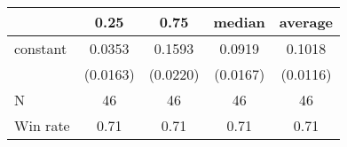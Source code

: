 \begin{tabular}{lcccc}
\hline
         &   0.25   &   0.75   &  median  & average   \\
\midrule
\midrule
constant & 0.0353   & 0.1593   & 0.0919   & 0.1018    \\
         & (0.0163) & (0.0220) & (0.0167) & (0.0116)  \\
N        & 46       & 46       & 46       & 46        \\
Win rate & 0.71     & 0.71     & 0.71     & 0.71      \\
\hline
\end{tabular}